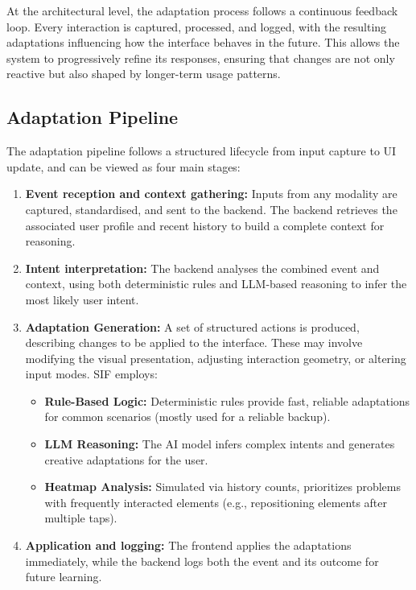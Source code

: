 \documentclass[openany]{book}
\begin{document}
At the architectural level, the adaptation process follows a continuous feedback loop. Every interaction is captured, processed, and logged, with the resulting adaptations influencing how the interface behaves in the future. This allows the system to progressively refine its responses, ensuring that changes are not only reactive but also shaped by longer-term usage patterns.

\subsection{Adaptation Pipeline}
The adaptation pipeline follows a structured lifecycle from input capture to UI update, and can be viewed as four main stages:
\begin{enumerate}
    \item \textbf{Event reception and context gathering:} Inputs from any modality are captured, standardised, and sent to the backend. The backend retrieves the associated user profile and recent history to build a complete context for reasoning.
    \item \textbf{Intent interpretation:} The backend analyses the combined event and context, using both deterministic rules and LLM-based reasoning to infer the most likely user intent.
    \item \textbf{Adaptation Generation:} A set of structured actions is produced, describing changes to be applied to the interface. These may involve modifying the visual presentation, adjusting interaction geometry, or altering input modes. SIF employs:
        \begin{itemize}
            \item \textbf{Rule-Based Logic:} Deterministic rules provide fast, reliable adaptations for common scenarios (mostly used for a reliable backup).
            \item \textbf{LLM Reasoning:} The AI model infers complex intents and generates creative adaptations for the user.
            \item \textbf{Heatmap Analysis:} Simulated via history counts, prioritizes problems with frequently interacted elements (e.g., repositioning elements after multiple taps).
        \end{itemize}
    \item \textbf{Application and logging:} The frontend applies the adaptations immediately, while the backend logs both the event and its outcome for future learning.
\end{enumerate}
\end{document}
